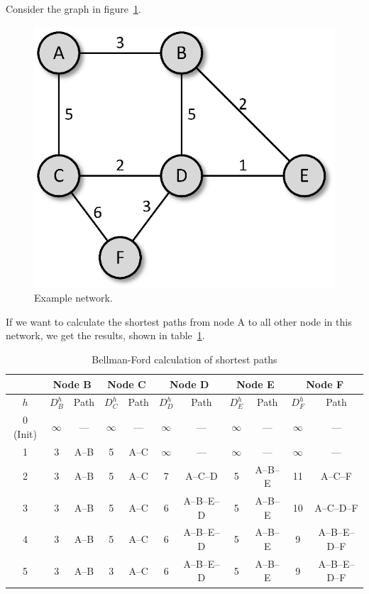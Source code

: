 \documentclass[a4paper]{article}
\begin{document}
\noindent{}Consider the graph in figure~\ref{fig:SP_Graph}.
\begin{figure}[ht]
\centering
\includegraphics[scale=0.8]{sp_graph.eps}
\caption{\label{fig:SP_Graph}Example network.}
\end{figure}

\noindent{}If we want to calculate the shortest paths from node A
to all other node in this network, we get the results, shown in
table~\ref{tbl:BF-Results}.

\begin{table}[ht]
\centering
\begin{tabular}{|c|c|c|c|c|c|c|c|c|c|c|}\hline
%
 & \multicolumn{2}{|c|}{Node B} & \multicolumn{2}{|c|}{Node C} &
 \multicolumn{2}{|c|}{Node D} & \multicolumn{2}{|c|}{Node E} &
 \multicolumn{2}{|c|}{Node F}\\ \hline
%
$h$ & $D^{h}_B$ & Path & $D^{h}_C$ & Path & $D^{h}_D$ & Path &
$D^{h}_E$ & Path & $D^{h}_F$ & Path \\ \hline
%
0 (Init) & $\infty$ & --- & $\infty$ & --- & $\infty$ & --- &
$\infty$ & --- & $\infty$ & --- \\ \hline
%
1 & 3 & A--B & 5 & A--C & $\infty$ & --- & $\infty$ & --- &
$\infty$ & --- \\ \hline
%
2 & 3 & A--B & 5 & A--C & 7 & A--C--D & 5 & A--B--E & 11 & A--C--F \\
\hline
%
3 & 3 & A--B & 5 & A--C & 6 & A--B--E--D & 5 & A--B--E & 10 & A--C--D--F \\
\hline
%
4 & 3 & A--B & 5 & A--C & 6 & A--B--E--D & 5 & A--B--E & 9 &
A--B--E--D--F \\ \hline
%
5 & 3 & A--B & 3 & A--C & 6 & A--B--E--D & 5 & A--B--E & 9 &
A--B--E--D--F \\ \hline
\end{tabular}
\caption{\label{tbl:BF-Results}Bellman-Ford calculation of
shortest paths}
\end{table}
\end{document}
